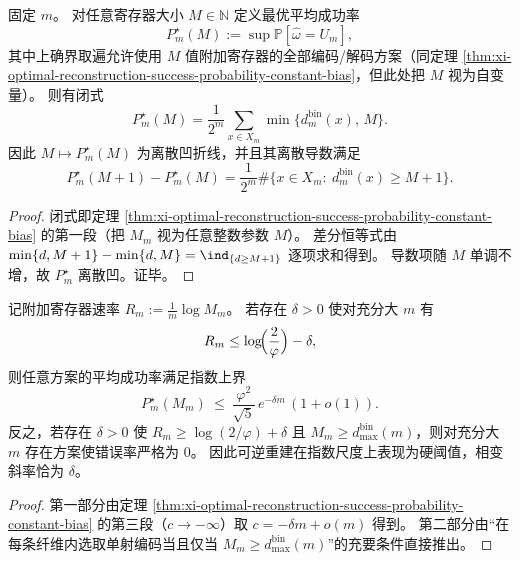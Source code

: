 

\begin{proposition}\label{prop:xi-reconstruction-success-curve-discrete-derivative}
固定 \(m\)。
对任意寄存器大小 \(M\in\mathbb N\) 定义最优平均成功率
\[
P_m^\star(M):=\sup\mathbb P[\widehat\omega=U_m],
\]
其中上确界取遍允许使用 \(M\) 值附加寄存器的全部编码/解码方案（同定理 \ref{thm:xi-optimal-reconstruction-success-probability-constant-bias}，但此处把 \(M\) 视为自变量）。
则有闭式
\[
P_m^\star(M)=\frac{1}{2^m}\sum_{x\in X_m}\min\!\bigl\{d^{\mathrm{bin}}_m(x),\,M\bigr\}.
\]
因此 \(M\mapsto P_m^\star(M)\) 为离散凹折线，并且其离散导数满足
\[
P_m^\star(M+1)-P_m^\star(M)=\frac{1}{2^m}\#\{x\in X_m:\ d^{\mathrm{bin}}_m(x)\ge M+1\}.
\]
\end{proposition}

\begin{proof}
闭式即定理 \ref{thm:xi-optimal-reconstruction-success-probability-constant-bias} 的第一段（把 \(M_m\) 视为任意整数参数 \(M\)）。
差分恒等式由
\(
\min\{d,M+1\}-\min\{d,M\}=\ind_{\{d\ge M+1\}}
\)
逐项求和得到。
导数项随 \(M\) 单调不增，故 \(P_m^\star\) 离散凹。证毕。
\end{proof}

\begin{theorem}\label{thm:xi-strong-converse-exponent-below-critical-rate}
记附加寄存器速率 \(R_m:=\frac{1}{m}\log M_m\)。
若存在 \(\delta>0\) 使对充分大 \(m\) 有
\[
R_m\le \log\!\Bigl(\frac{2}{\varphi}\Bigr)-\delta,
\]
则任意方案的平均成功率满足指数上界
\[
P_m^\star(M_m)\ \le\ \frac{\varphi^2}{\sqrt5}\,e^{-\delta m}\,(1+o(1)).
\]
反之，若存在 \(\delta>0\) 使 \(R_m\ge \log(2/\varphi)+\delta\) 且 \(M_m\ge d^{\mathrm{bin}}_{\max}(m)\)，则对充分大 \(m\) 存在方案使错误率严格为 \(0\)。
因此可逆重建在指数尺度上表现为硬阈值，相变斜率恰为 \(\delta\)。
\end{theorem}

\begin{proof}
第一部分由定理 \ref{thm:xi-optimal-reconstruction-success-probability-constant-bias} 的第三段（\(c\to-\infty\)）取 \(c=-\delta m+o(m)\) 得到。
第二部分由“在每条纤维内选取单射编码当且仅当 \(M_m\ge d^{\mathrm{bin}}_{\max}(m)\)”的充要条件直接推出。
\end{proof}


